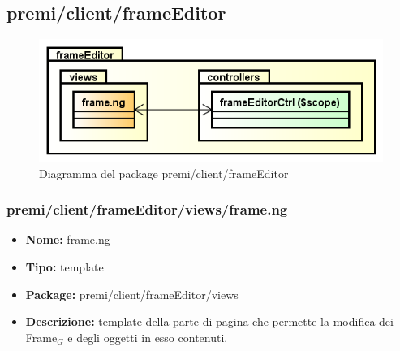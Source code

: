 \subsection{premi/client/frameEditor}
\begin{figure}[!h]
\begin{center}
\includegraphics[scale=0.45]{img/diapkg/frameEditor.png}
\caption{Diagramma del package premi/client/frameEditor}
\end{center}
\end{figure}
\subsubsection{premi/client/frameEditor/views/frame.ng}
\begin{itemize}
  \item[] \textbf{Nome:} frame.ng
  \item[] \textbf{Tipo:} template
  \item[] \textbf{Package:} premi/client/frameEditor/views
  \item[] \textbf{Descrizione:} template della parte di pagina che permette la modifica dei Frame$_G$ e degli oggetti in esso contenuti.
\end{itemize}
